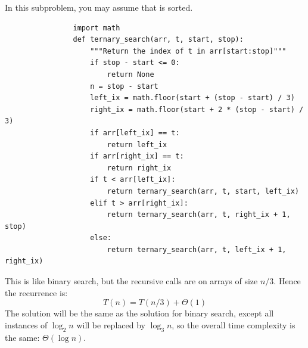\begin{prob}
\begin{subprobset}
        \begin{subprob}
            In this subproblem, you may assume that  is sorted.
            \begin{verbatim}
                import math
                def ternary_search(arr, t, start, stop):
                    """Return the index of t in arr[start:stop]"""
                    if stop - start <= 0:
                        return None
                    n = stop - start
                    left_ix = math.floor(start + (stop - start) / 3)
                    right_ix = math.floor(start + 2 * (stop - start) / 3)
                    if arr[left_ix] == t:
                        return left_ix
                    if arr[right_ix] == t:
                        return right_ix
                    if t < arr[left_ix]:
                        return ternary_search(arr, t, start, left_ix)
                    elif t > arr[right_ix]:
                        return ternary_search(arr, t, right_ix + 1, stop)
                    else:
                        return ternary_search(arr, t, left_ix + 1, right_ix)
            \end{verbatim}

            \begin{soln}
                This is like binary search, but the recursive calls are on arrays of
                size $n/3$. Hence the recurrence is:
                \[
                    T(n) = T(n/3) + \Theta(1)
                \]
                The solution will be the same as the solution for binary search, except
                all instances of $\log_2 n$ will be replaced by $\log_3 n$, so the overall
                time complexity is the same: $\Theta(\log n)$.
            \end{soln}
        \end{subprob}

    \end{subprobset}

\end{prob}
